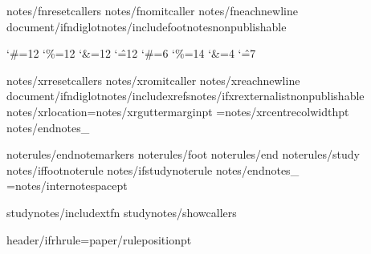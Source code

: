 

{notes/fnresetcallers}
{notes/fnomitcaller}
{notes/fneachnewline}
{document/ifndiglot}{notes/includefootnotes}\expandafter\def\csname f:properties\endcsname{{nonpublishable}}

\catcode`\#=12 \catcode`\%=12 \catcode`\&=12 \catcode`\^=12
\catcode`\#=6 \catcode`\%=14 \catcode`\&=4 \catcode`\^=7
%

{notes/xrresetcallers}
{notes/xromitcaller}
{notes/xreachnewline}
{document/ifndiglot}{notes/includexrefs}{notes/ifxrexternalist}\expandafter\def\csname x:properties\endcsname{{nonpublishable}}
{notes/xrlocation}\def\XrefNotes{{x}}\XrefNotesMargin={notes/xrguttermargin}pt \XrefNotesWidth={notes/xrcentrecolwidth}pt\def\XrefSide{{{notes/xrcolside}}}
{notes/endnotes_}

{noterules/endnotemarkers}
{noterules/foot}
{noterules/end}
{noterules/study}
{notes/iffootnoterule}\def\FootNoteRuleThickness{{0pt}}
{notes/ifstudynoterule}\def\StudyNoteRuleThickness{{0pt}}
{notes/endnotes_}\def\EndNoteRuleThickness{{0pt}}
\InterNoteSpace={notes/internotespace}pt

{studynotes/includextfn}
{studynotes/showcallers}

\def\HeaderPosition{{{paper/headerposition}}}
\def\FooterPosition{{{paper/footerposition}}}
{header/ifrhrule}\RHruleposition={paper/ruleposition}pt
\def\RangeSeparator{{\kern.1em{rangesep_}\kern.1em}} %
\def\ChapterVerseSeparator{{\kern.02em{chvssep_}\kern.02em}} %

